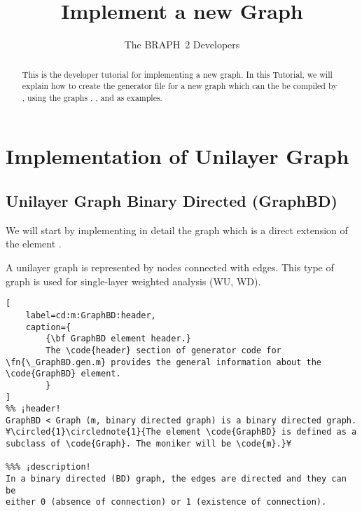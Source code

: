 \documentclass{tufte-handout}
\title{Implement a new Graph}
\author[The BRAPH~2 Developers]{The BRAPH~2 Developers}
\begin{document}
\maketitle

\begin{abstract}
\noindent
This is the developer tutorial for implementing a new graph. 
In this Tutorial, we will explain how to create the generator file  for a new graph which can the be compiled by , using the graphs , ,  and  as examples.
\end{abstract}

\tableofcontents

\clearpage
\section{Implementation of Unilayer Graph}

\subsection{Unilayer Graph Binary Directed (GraphBD)}

We will start by implementing in detail the graph  which  is a direct extension of the element .

A unilayer graph is represented by nodes connected with edges. This type of graph is used for single-layer weighted analysis (WU, WD).

\begin{lstlisting}[
	label=cd:m:GraphBD:header,
	caption={
		{\bf GraphBD element header.}
		The \code{header} section of generator code for \fn{\_GraphBD.gen.m} provides the general information about the \code{GraphBD} element.
		}
]
%% ¡header!
GraphBD < Graph (m, binary directed graph) is a binary directed graph. ¥\circled{1}\circlednote{1}{The element \code{GraphBD} is defined as a subclass of \code{Graph}. The moniker will be \code{m}.}¥

%%% ¡description!
In a binary directed (BD) graph, the edges are directed and they can be 
either 0 (absence of connection) or 1 (existence of connection).
\end{lstlisting}
\end{document}
